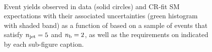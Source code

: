 \begin{figure}[h!]
\begin{center}
    \\
    \caption{Event yields observed in data (solid circles) and CR-fit SM expectations with their associated uncertainties (green histogram with shaded band) as a function of \HTmiss based on a sample of events that satisfy $n_{\text{jet}} = 5$ and $n_{\text{b}} = 2$, as well as the requirements on \scalht indicated by each sub-figure caption. }
    \label{fig:mhtval_eq5j_eq2b}
  \end{center}
\end{figure}

